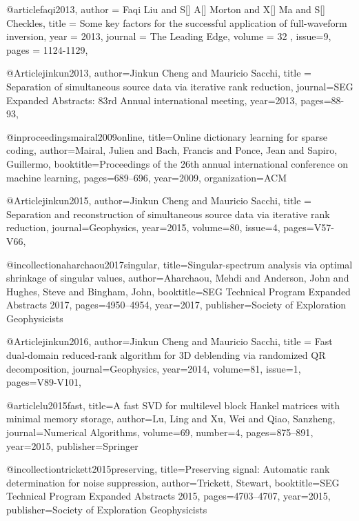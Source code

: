 @article{faqi2013,
  author =	 {Faqi Liu and S[] A[] Morton and X[] Ma and S[] Checkles},
  title =	 {Some key factors for the successful application of full-waveform inversion},
  year =	 2013,
  journal =	 {The Leading Edge},
  volume = 32	 ,
  issue=9,
  pages =	 {1124-1129},
}


@Article{jinkun2013,
  author={Jinkun Cheng and Mauricio Sacchi},
  title = {Separation of simultaneous source data via iterative rank reduction},
  journal={SEG Expanded Abstracts: 83rd Annual international meeting},
  year=2013,
  pages={88-93},
}

@inproceedings{mairal2009online,
  title={Online dictionary learning for sparse coding},
  author={Mairal, Julien and Bach, Francis and Ponce, Jean and Sapiro, Guillermo},
  booktitle={Proceedings of the 26th annual international conference on machine learning},
  pages={689--696},
  year={2009},
  organization={ACM}
}

@Article{jinkun2015,
  author={Jinkun Cheng and Mauricio Sacchi},
  title = {Separation and reconstruction of simultaneous source data via iterative rank reduction},
  journal={Geophysics},
  year=2015,
  volume=80,
  issue=4,
  pages={V57-V66},
}

@incollection{aharchaou2017singular,
  title={Singular-spectrum analysis via optimal shrinkage of singular values},
  author={Aharchaou, Mehdi and Anderson, John and Hughes, Steve and Bingham, John},
  booktitle={SEG Technical Program Expanded Abstracts 2017},
  pages={4950--4954},
  year={2017},
  publisher={Society of Exploration Geophysicists}
}


@Article{jinkun2016,
  author={Jinkun Cheng and Mauricio Sacchi},
  title = {Fast dual-domain reduced-rank algorithm for 3{D} deblending via randomized QR decomposition},
  journal={Geophysics},
  year=2014,
  volume=81,
  issue=1,
  pages={V89-V101},
}

@article{lu2015fast,
  title={A fast SVD for multilevel block Hankel matrices with minimal memory storage},
  author={Lu, Ling and Xu, Wei and Qiao, Sanzheng},
  journal={Numerical Algorithms},
  volume={69},
  number={4},
  pages={875--891},
  year={2015},
  publisher={Springer}
}

@incollection{trickett2015preserving,
  title={Preserving signal: Automatic rank determination for noise suppression},
  author={Trickett, Stewart},
  booktitle={SEG Technical Program Expanded Abstracts 2015},
  pages={4703--4707},
  year={2015},
  publisher={Society of Exploration Geophysicists}
}

